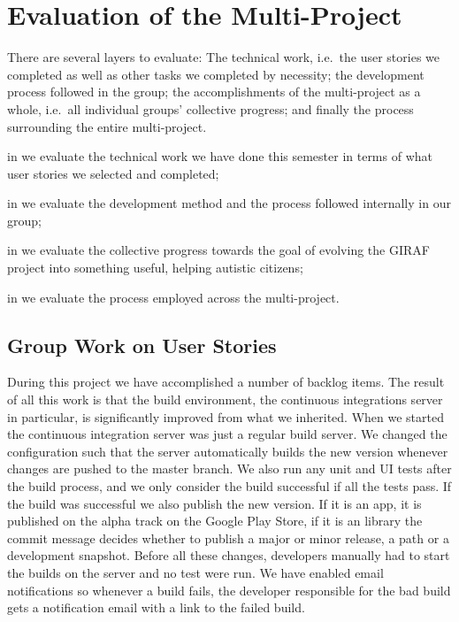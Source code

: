 \chapter{Evaluation of the Multi-Project}\label{chap:evaluation}

There are several layers to evaluate: The technical work, i.e.\ the user stories we completed as well as other tasks we completed by necessity; the development process followed in the group; the accomplishments of the multi-project as a whole, i.e.\ all individual groups' collective progress; and finally the process surrounding the entire multi-project. 

\begin{chapterorganization}
  \item in  we evaluate the technical work we have done this semester in terms of what user stories we selected and completed;
  \item in  we evaluate the development method and the process followed internally in our group;
  \item in  we evaluate the collective progress towards the goal of evolving the GIRAF project into something useful, helping autistic citizens;
  \item in  we evaluate the process employed across the multi-project.
\end{chapterorganization}

\section{Group Work on User Stories}\label{conc:userstories}

During this project we have accomplished a number of backlog items. The result of all this work is that the build environment, the continuous integrations server in particular, is significantly improved from what we inherited. When we started the continuous integration server was just a regular build server. We changed the configuration such that the server automatically builds the new version whenever changes are pushed to the master branch. We also run any unit and UI tests after the build process, and we only consider the build successful if all the tests pass. If the build was successful we also publish the new version. If it is an app, it is published on the alpha track on the Google Play Store, if it is an library the commit message decides whether to publish a major or minor release, a path or a development snapshot. Before all these changes, developers manually had to start the builds on the server and no test were run. We have enabled email notifications so whenever a build fails, the developer responsible for the bad build gets a notification email with a link to the failed build.

